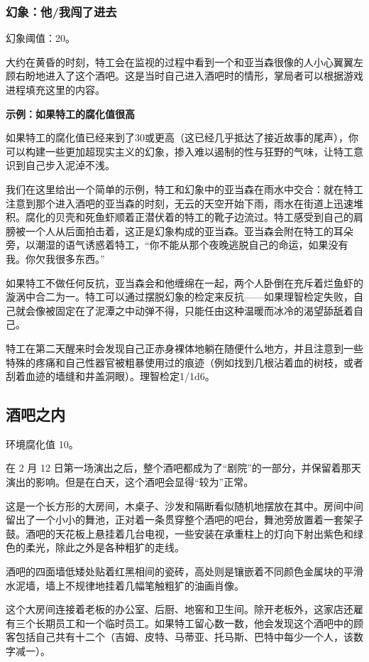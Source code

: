 \subsubsection{幻象：他/我闯了进去}

幻象阈值：20。

大约在黄昏的时刻，特工会在监视的过程中看到一个和亚当森很像的人小心翼翼左顾右盼地进入了这个酒吧。这是当时自己进入酒吧时的情形，掌局者可以根据游戏进程填充这里的内容。

\textbf{示例：如果特工的腐化值很高}

如果特工的腐化值已经来到了30或更高（这已经几乎抵达了接近故事的尾声），你可以构建一些更加超现实主义的幻象，掺入难以遏制的性与狂野的气味，让特工意识到自己步入泥淖不浅。

我们在这里给出一个简单的示例，特工和幻象中的亚当森在雨水中交合：就在特工注意到那个进入酒吧的亚当森的时刻，无云的天空开始下雨，雨水在街道上迅速堆积。腐化的贝壳和死鱼虾顺着正潜伏着的特工的靴子边流过。特工感受到自己的肩膀被一个人从后面拍击着，这正是幻象构成的亚当森。亚当森会附在特工的耳朵旁，以潮湿的语气诱惑着特工，“你不能从那个夜晚逃脱自己的命运，如果没有我。你欠我很多东西。”

如果特工不做任何反抗，亚当森会和他缠绵在一起，两个人卧倒在充斥着烂鱼虾的漩涡中合二为一。特工可以通过摆脱幻象的检定来反抗——如果理智检定失败，自己就会像被固定在了泥潭之中动弹不得，只能任由这种温暖而冰冷的渴望舔舐着自己。

特工在第二天醒来时会发现自己正赤身裸体地躺在随便什么地方，并且注意到一些特殊的疼痛和自己性器官被粗暴使用过的痕迹（例如找到几根沾着血的树枝，或者刮着血迹的墙缝和井盖洞眼）。理智检定1/1d6。

\subsection{酒吧之内}
环境腐化值 10。

在 2 月 12 日第一场演出之后，整个酒吧都成为了“剧院”的一部分，并保留着那天演出的影响。但是在白天，这个酒吧会显得“较为”正常。

这是一个长方形的大房间，木桌子、沙发和隔断看似随机地摆放在其中。房间中间留出了一个小小的舞池，正对着一条贯穿整个酒吧的吧台，舞池旁放置着一套架子鼓。酒吧的天花板上悬挂着几台电视，一些安装在承重柱上的灯向下射出紫色和绿色的柔光，除此之外是各种粗犷的走线。

酒吧的四面墙低矮处贴着红黑相间的瓷砖，高处则是镶嵌着不同颜色金属块的平滑水泥墙，墙上不规律地挂着几幅笔触粗犷的油画肖像。

这个大房间连接着老板的办公室、后厨、地窖和卫生间。除开老板外，这家店还雇有三个长期员工和一个临时员工。如果特工留心数一数，他会发现这个酒吧中的顾客包括自己共有十二个（吉姆、皮特、马蒂亚、托马斯、巴特中每少一个人，该数字减一）。

